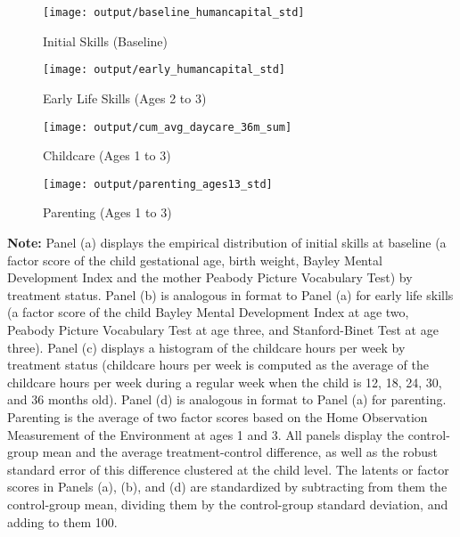 \begin{sidewaysfigure}
\centering
\caption{Measure Description: Initial Skills, Early Life Skills, and Inputs} \label{figure:measures}
\begin{subfigure}[h]{0.4\textwidth}
	\centering
	\caption{Initial Skills (Baseline)}  
	\texttt{[image: output/baseline\_humancapital\_std]}
\end{subfigure}
\begin{subfigure}[h]{0.4\textwidth}
	\centering
	\caption{Early Life Skills (Ages 2 to 3)}  
	\texttt{[image: output/early\_humancapital\_std]}
\end{subfigure}

\begin{subfigure}[h]{0.4\textwidth}
	\centering
	\caption{Childcare (Ages 1 to 3)} 
	\texttt{[image: output/cum\_avg\_daycare\_36m\_sum]}
\end{subfigure}
\begin{subfigure}[h]{0.4\textwidth}
	\centering
	\caption{Parenting (Ages 1 to 3)}  
	\texttt{[image: output/parenting\_ages13\_std]}
\end{subfigure}

\footnotesize
\justify
\textbf{Note:} Panel (a) displays the empirical distribution of initial skills at baseline (a factor score of the child gestational age, birth weight, Bayley Mental Development Index and the mother Peabody Picture Vocabulary Test) by treatment status. Panel (b) is analogous in format to Panel (a) for early life skills (a factor score of the child Bayley Mental Development Index at age two, Peabody Picture Vocabulary Test at age three, and Stanford-Binet Test at age three). Panel (c) displays a histogram of the childcare hours per week by treatment status (childcare hours per week is computed as the average of the childcare hours per week during a regular week when the child is 12, 18, 24, 30, and 36 months old). Panel (d) is analogous in format to Panel (a) for parenting. Parenting is the average of two factor scores based on the Home Observation Measurement of the Environment at ages 1 and 3. All panels display the control-group mean and the average treatment-control difference, as well as the robust standard error of this difference clustered at the child level. The latents or factor scores in Panels (a), (b), and (d) are standardized by subtracting from them the control-group mean, dividing them by the control-group standard deviation, and adding to them 100. 
\end{sidewaysfigure}

